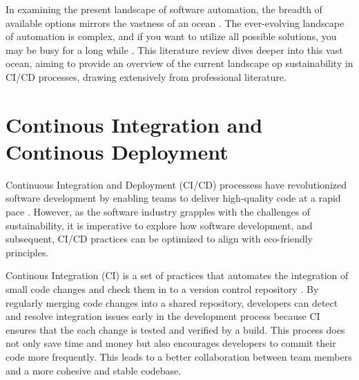 

In examining the present landscape of software automation, the breadth of available options mirrors the vastness of an ocean \autocite{King2019}.
The ever-evolving landscape of automation is complex, and if you want to utilize all possible solutions, you may be busy for a long while \autocite{King2019}.
This literature review dives deeper into this vast ocean, aiming to provide an overview of the current landscape op sustainability in CI/CD processes, drawing extensively from professional literature.

\section{Continous Integration and Continous Deployment}
Continuous Integration and Deployment (CI/CD) processess have revolutionized software development by enabling teams to deliver high-quality code at a rapid pace \autocite{infoworld}.
However, as the software industry grapples with the challenges of sustainability, it is imperative to explore how software development, and subsequent, CI/CD practices can be optimized to align with eco-friendly principles.

Continous Integration (CI) is a set of practices that automates the integration of small code changes and check them in to a version control repository \autocite{infoworld}.
By regularly merging code changes into a shared repository, developers can detect and resolve integration issues early in the development process because CI ensures that the each change is tested and verified by a build.
This process does not only save time and money but also encourages developers to commit their code more frequently.
This leads to a better collaboration between team members and a more cohesive and stable codebase.

